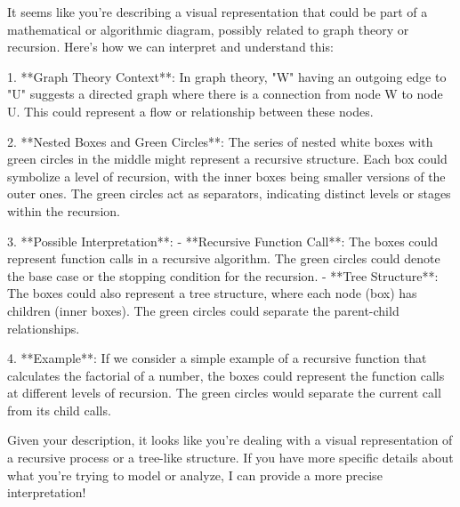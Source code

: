 It seems like you're describing a visual representation that could be part of a mathematical or algorithmic diagram, possibly related to graph theory or recursion. Here's how we can interpret and understand this:

1. **Graph Theory Context**: In graph theory, "W" having an outgoing edge to "U" suggests a directed graph where there is a connection from node W to node U. This could represent a flow or relationship between these nodes.

2. **Nested Boxes and Green Circles**: The series of nested white boxes with green circles in the middle might represent a recursive structure. Each box could symbolize a level of recursion, with the inner boxes being smaller versions of the outer ones. The green circles act as separators, indicating distinct levels or stages within the recursion.

3. **Possible Interpretation**:
   - **Recursive Function Call**: The boxes could represent function calls in a recursive algorithm. The green circles could denote the base case or the stopping condition for the recursion.
   - **Tree Structure**: The boxes could also represent a tree structure, where each node (box) has children (inner boxes). The green circles could separate the parent-child relationships.

4. **Example**: If we consider a simple example of a recursive function that calculates the factorial of a number, the boxes could represent the function calls at different levels of recursion. The green circles would separate the current call from its child calls.

Given your description, it looks like you're dealing with a visual representation of a recursive process or a tree-like structure. If you have more specific details about what you're trying to model or analyze, I can provide a more precise interpretation!